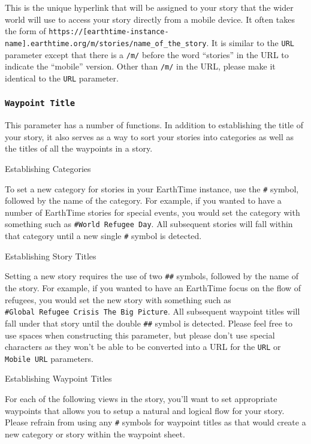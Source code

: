 \documentclass[
  12pt,
]{krantz}
\begin{document}
This is the unique hyperlink that will be assigned to your story that the wider world will use to access your story directly from a mobile device. It often takes the form of \texttt{https://{[}earthtime-instance-name{]}.earthtime.org/m/stories/name\_of\_the\_story}. It is similar to the \texttt{URL} parameter except that there is a \texttt{/m/} before the word ``stories'' in the URL to indicate the ``mobile'' version. Other than \texttt{/m/} in the URL, please make it identical to the \texttt{URL} parameter.

\hypertarget{waypoint-title}{%
\subsubsection*{\texorpdfstring{\texttt{Waypoint\ Title}}{Waypoint Title}}\label{waypoint-title}}


This parameter has a number of functions. In addition to establishing the title of your story, it also serves as a way to sort your stories into categories as well as the titles of all the waypoints in a story.

Establishing Categories

To set a new category for stories in your EarthTime instance, use the \texttt{\#} symbol, followed by the name of the category. For example, if you wanted to have a number of EarthTime stories for special events, you would set the category with something such as \texttt{\#World\ Refugee\ Day}. All subsequent stories will fall within that category until a new single \texttt{\#} symbol is detected.

Establishing Story Titles

Setting a new story requires the use of two \texttt{\#\#} symbols, followed by the name of the story. For example, if you wanted to have an EarthTime focus on the flow of refugees, you would set the new story with something such as \texttt{\#Global\ Refugee\ Crisis\ The\ Big\ Picture}. All subsequent waypoint titles will fall under that story until the double \texttt{\#\#} symbol is detected. Please feel free to use spaces when constructing this parameter, but please don't use special characters as they won't be able to be converted into a URL for the \texttt{URL} or \texttt{Mobile\ URL} parameters.

Establishing Waypoint Titles

For each of the following views in the story, you'll want to set appropriate waypoints that allows you to setup a natural and logical flow for your story. Please refrain from using any \texttt{\#} symbols for waypoint titles as that would create a new category or story within the waypoint sheet.
\end{document}
